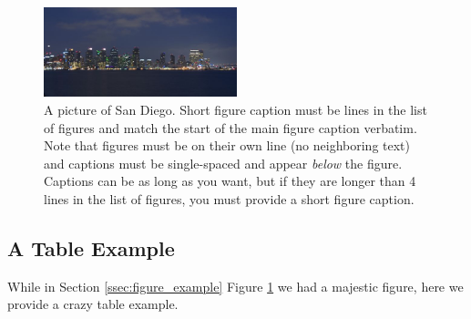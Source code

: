 \documentclass[12pt,chapterheads]{ucsd}
\begin{document}
\begin{figure}[h] 
  \centering
  \includegraphics[width=0.5\textwidth]{sandiego}
  \caption[A picture of San Diego. Short figure caption must be  lines in the list of figures]
{A picture of San Diego.  Short figure caption must be  lines in the list of figures and match the start of the main figure caption verbatim. Note that figures must be on their own line (no neighboring text) and captions must be single-spaced and appear \protect\textit{below} the figure.  Captions can be as long as you want, but if they are longer than 4 lines in the list of figures, you must provide a short figure caption.}
  \label{fig:sandiego}
\end{figure}

\subsection{A Table Example}

While in Section \ref{ssec:figure_example} Figure \ref{fig:sandiego} we had a majestic figure, here we provide a crazy table example.
\end{document}
